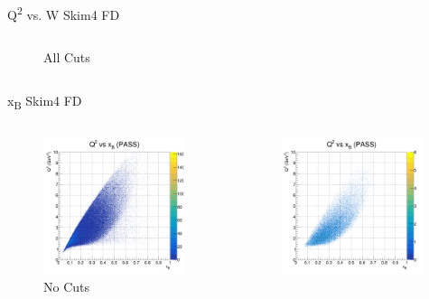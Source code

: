 \documentclass[aspectratio=169]{beamer}
\begin{document}
\begin{frame}{Q\textsuperscript{2} vs. W  \hfill Skim4 FD}
\begin{columns}
\begin{figure}
        \caption{All Cuts}
    \end{figure}
    \end{columns}
\end{frame}

\begin{frame}{x\textsubscript{B}  \hfill Skim4 FD}
\vspace*{-0.6cm}
\begin{columns}
    \begin{figure}
        \centering
        \includegraphics[width=0.97\textwidth]{pdfs/hists/PASS/q2Xb.png}
        \caption{No Cuts}
    \end{figure}
    \begin{figure}
        \centering
        \includegraphics[width=0.97\textwidth]{pdfs/all_cuts/PASS/q2Xb.png}

\end{figure}
\end{columns}
\end{frame}
\end{document}
